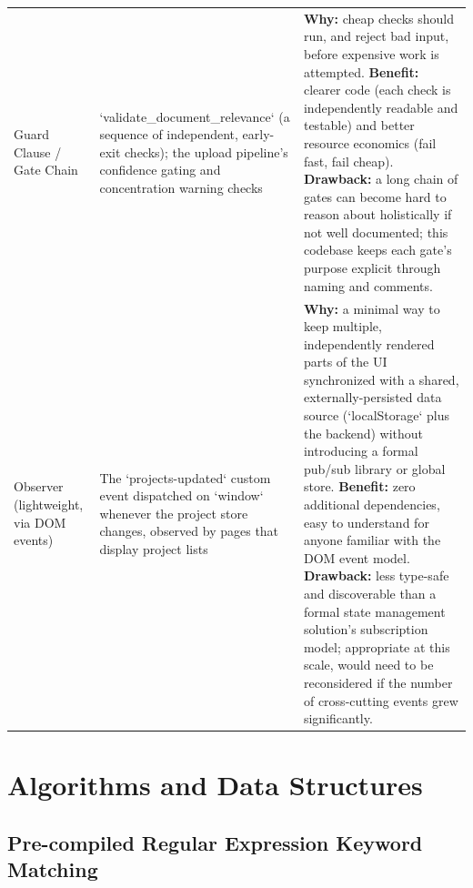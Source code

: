 \documentclass[11pt,a4paper]{report}
\begin{document}
\begin{longtable}{p{2.6cm}p{2.6cm}p{6.8cm}}
Guard Clause / Gate Chain & `validate\_document\_relevance` (a sequence of independent, early-exit checks); the upload pipeline's confidence gating and concentration warning checks & \textbf{Why:} cheap checks should run, and reject bad input, before expensive work is attempted. \textbf{Benefit:} clearer code (each check is independently readable and testable) and better resource economics (fail fast, fail cheap). \textbf{Drawback:} a long chain of gates can become hard to reason about holistically if not well documented; this codebase keeps each gate's purpose explicit through naming and comments. \\
Observer (lightweight, via DOM events) & The `projects-updated` custom event dispatched on `window` whenever the project store changes, observed by pages that display project lists & \textbf{Why:} a minimal way to keep multiple, independently rendered parts of the UI synchronized with a shared, externally-persisted data source (`localStorage` plus the backend) without introducing a formal pub/sub library or global store. \textbf{Benefit:} zero additional dependencies, easy to understand for anyone familiar with the DOM event model. \textbf{Drawback:} less type-safe and discoverable than a formal state management solution's subscription model; appropriate at this scale, would need to be reconsidered if the number of cross-cutting events grew significantly. \\
\bottomrule
\end{longtable}

\chapter{Algorithms and Data Structures}

\section{Pre-compiled Regular Expression Keyword Matching}
\end{document}

